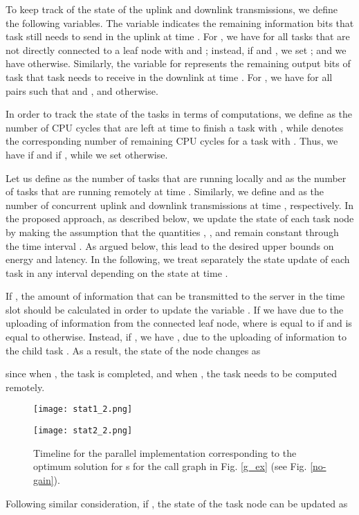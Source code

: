 \documentclass[journal,twocolumn,10pt,twoside]{IEEEtranTCOM}
\theoremstyle{plain}
\theoremstyle{plain}
\theoremstyle{remark}
\begin{document}
To keep track of the state of the uplink and downlink transmissions, we define the following variables. The variable  indicates the remaining information bits that task  still needs to send in the uplink at time . For , we have  for all tasks  that are not directly connected to a leaf node with  and ; instead, if  and , we set ; and we have  otherwise. Similarly, the variable  for  represents the remaining output bits of task  that task  needs to receive in the downlink at time . For , we have  for all pairs  such that  and , and  otherwise.

In order to track the state of the tasks in terms of computations, we define as  the number of CPU cycles that are left at time  to finish a task  with , while  denotes the corresponding number of remaining CPU cycles for a task  with . Thus, we have   if  and  if , while we set  otherwise.



Let us define  as the number of tasks that are running locally and   as the number of tasks that are running remotely at time . Similarly, we define   and   as the number of concurrent uplink  and downlink transmissions at time , respectively. In the proposed approach, as described below, we update the state  of each task node by making the assumption that the quantities , ,  and  remain constant through the time interval  . As argued below, this lead to the desired upper bounds on energy and latency. In the following, we treat separately the state update of each task  in any interval  depending on the state  at time .


If ,  the amount of information that can be transmitted to the server in the time slot   should be calculated in order to update the variable . If  we have   due to the uploading of information from the connected leaf node, where  is equal to  if  and  is equal to  otherwise. Instead, if , we have  ,  due to the uploading of information to the  child task . As a result, the state of the node changes as

since when , the task is completed, and when , the task  needs to be computed remotely.

\begin{figure}
\centering
\begin{minipage}{.8\linewidth}
\texttt{[image: stat1\_2.png]}
\end{minipage}
\begin{minipage}{.8\linewidth}
\texttt{[image: stat2\_2.png]}
\end{minipage}
\caption{Timeline for the parallel implementation corresponding to the optimum solution for  s for the call graph in Fig. \ref{g_ex} (see Fig. \ref{no-gain}).}\label{time}
\vspace{-1.5em}
\end{figure}
Following similar consideration, if , the state of the task node  can be updated as
\end{document}
